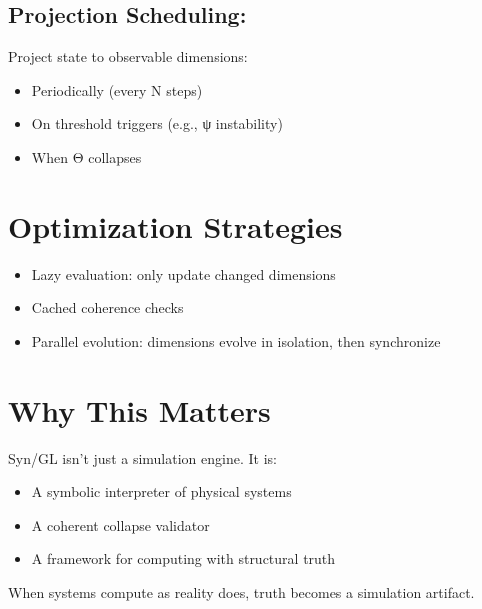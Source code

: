 \subsection*{Projection Scheduling:}

Project state to observable dimensions:
\begin{itemize}
\item Periodically (every N steps)
\item On threshold triggers (e.g., ψ instability)
\item When Θ collapses
\end{itemize}

\section{Optimization Strategies}

\begin{itemize}
\item Lazy evaluation: only update changed dimensions
\item Cached coherence checks
\item Parallel evolution: dimensions evolve in isolation, then synchronize
\end{itemize}

\section{Why This Matters}

Syn/GL isn't just a simulation engine. It is:
\begin{itemize}
\item A symbolic interpreter of physical systems
\item A coherent collapse validator
\item A framework for computing with structural truth
\end{itemize}

\bigskip

When systems compute as reality does, truth becomes a simulation artifact.
